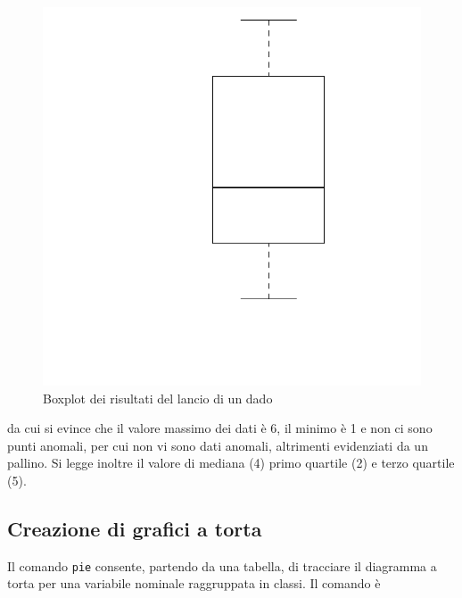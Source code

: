 \documentclass[onecolumn,12pt]{book}\usepackage[]{graphicx}\usepackage[]{color}
\makeatletter
\def\maxwidth{ %
  \ifdim\Gin@nat@width>\linewidth
    \linewidth
  \else
    \Gin@nat@width
  \fi
}
\newenvironment{knitrout}{}{} %
\makeatother
\begin{document}
\begin{figure}[htbp]
\begin{center}
\begin{knitrout}
{\centering \includegraphics[width=\maxwidth]{figure/graphics-unnamed-chunk-110-1} 

}



\end{knitrout}
\caption{Boxplot dei risultati del lancio di un dado}
\label{fig:boxplotdado}
\end{center}
\end{figure}
da cui si evince che il valore massimo dei dati \`e 6, il minimo \`e 1 e non ci sono punti anomali, per cui non vi sono dati anomali, altrimenti evidenziati da un pallino. Si legge inoltre il valore di mediana (4) primo quartile (2) e terzo quartile (5).

\subsection{Creazione di grafici a torta}

Il comando \texttt{pie} consente, partendo da una tabella, di tracciare il diagramma a torta per una variabile nominale raggruppata in classi. Il comando \`e
\end{document}
